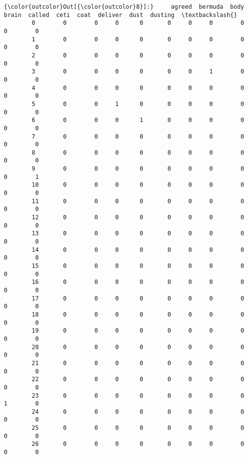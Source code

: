 \documentclass[11pt]{article}
\begin{document}
\begin{Verbatim}[commandchars=\\\{\}]
{\color{outcolor}Out[{\color{outcolor}8}]:}     agreed  bermuda  body  brain  called  ceti  coat  deliver  dust  dusting  \textbackslash{}
        0        0        0     0      0       0     0     0        0     0        0   
        1        0        0     0      0       0     0     0        0     0        0   
        2        0        0     0      0       0     0     0        0     0        0   
        3        0        0     0      0       0     0     1        0     0        0   
        4        0        0     0      0       0     0     0        0     0        0   
        5        0        0     1      0       0     0     0        0     0        0   
        6        0        0     0      1       0     0     0        0     0        0   
        7        0        0     0      0       0     0     0        0     0        0   
        8        0        0     0      0       0     0     0        0     0        0   
        9        0        0     0      0       0     0     0        0     0        1   
        10       0        0     0      0       0     0     0        0     0        0   
        11       0        0     0      0       0     0     0        0     0        0   
        12       0        0     0      0       0     0     0        0     0        0   
        13       0        0     0      0       0     0     0        0     0        0   
        14       0        0     0      0       0     0     0        0     0        0   
        15       0        0     0      0       0     0     0        0     0        0   
        16       0        0     0      0       0     0     0        0     0        0   
        17       0        0     0      0       0     0     0        0     0        0   
        18       0        0     0      0       0     0     0        0     0        0   
        19       0        0     0      0       0     0     0        0     0        0   
        20       0        0     0      0       0     0     0        0     0        0   
        21       0        0     0      0       0     0     0        0     0        0   
        22       0        0     0      0       0     0     0        0     0        0   
        23       0        0     0      0       0     0     0        0     1        0   
        24       0        0     0      0       0     0     0        0     0        0   
        25       0        0     0      0       0     0     0        0     0        0   
        26       0        0     0      0       0     0     0        0     0        0   

\end{Verbatim}
\end{document}
